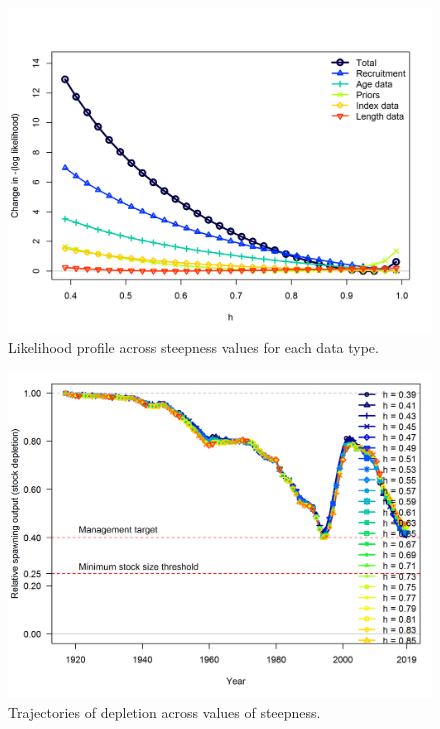 \documentclass[12pt,]{article}
\begin{document}
\begin{figure}
\centering
\includegraphics{Figures/profile_h_like.png}
\caption{Likelihood profile across steepness values for each data type.
\label{fig:profile_h_like}}
\end{figure}

\begin{figure}
\centering
\includegraphics{Figures/profile_h_depl.png}
\caption{Trajectories of depletion across values of steepness.
\label{fig:profile_h_depl}}
\end{figure}
\end{document}
